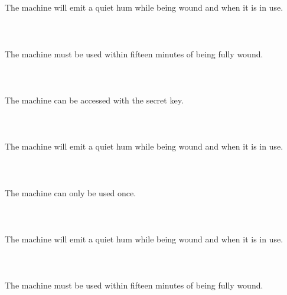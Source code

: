 \documentclass{article}
\begin{document}
    \section{}
    The machine will emit a quiet hum while being wound and when it is in use.\\\\ 
    \newpage
    
    \section{}
    The machine must be used within fifteen minutes of being fully wound.\\\\ 
    \newpage
    
    \section{}
    The machine can be accessed with the secret key.\\\\ 
    \newpage
    
    \section{}
    The machine will emit a quiet hum while being wound and when it is in use.\\\\ 
    \newpage
    
    \section{}
    The machine can only be used once.\\\\ 
    \newpage
    
    \section{}
    The machine will emit a quiet hum while being wound and when it is in use.\\\\ 
    \newpage
    
    \section{}
    The machine must be used within fifteen minutes of being fully wound.\\\\ 
    \newpage
    
\end{document}
